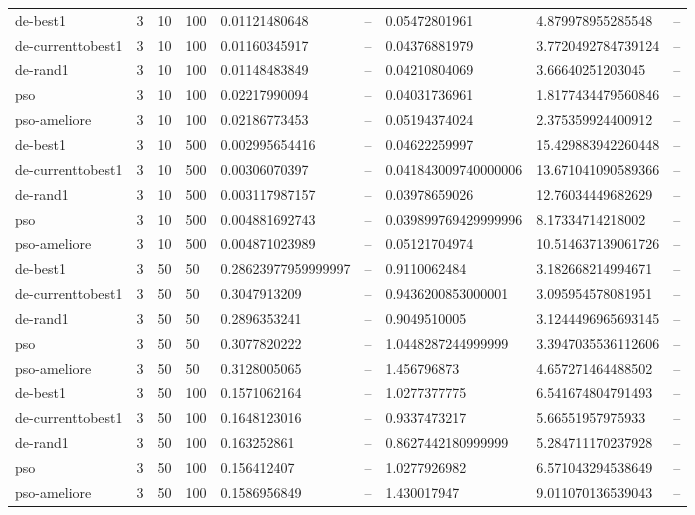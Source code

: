 \begin{table}[t]
\begin{tabular}{lllllllll}
de-best1 & 3 & 10 & 100 & 0.01121480648 & -- & 0.05472801961 & 4.879978955285548 & -- \\
de-currenttobest1 & 3 & 10 & 100 & 0.01160345917 & -- & 0.04376881979 & 3.7720492784739124 & -- \\
de-rand1 & 3 & 10 & 100 & 0.01148483849 & -- & 0.04210804069 & 3.66640251203045 & -- \\
pso & 3 & 10 & 100 & 0.02217990094 & -- & 0.04031736961 & 1.8177434479560846 & -- \\
pso-ameliore & 3 & 10 & 100 & 0.02186773453 & -- & 0.05194374024 & 2.375359924400912 & -- \\
de-best1 & 3 & 10 & 500 & 0.002995654416 & -- & 0.04622259997 & 15.429883942260448 & -- \\
de-currenttobest1 & 3 & 10 & 500 & 0.00306070397 & -- & 0.041843009740000006 & 13.671041090589366 & -- \\
de-rand1 & 3 & 10 & 500 & 0.003117987157 & -- & 0.03978659026 & 12.76034449682629 & -- \\
pso & 3 & 10 & 500 & 0.004881692743 & -- & 0.039899769429999996 & 8.17334714218002 & -- \\
pso-ameliore & 3 & 10 & 500 & 0.004871023989 & -- & 0.05121704974 & 10.514637139061726 & -- \\
de-best1 & 3 & 50 & 50 & 0.28623977959999997 & -- & 0.9110062484 & 3.182668214994671 & -- \\
de-currenttobest1 & 3 & 50 & 50 & 0.3047913209 & -- & 0.9436200853000001 & 3.095954578081951 & -- \\
de-rand1 & 3 & 50 & 50 & 0.2896353241 & -- & 0.9049510005 & 3.1244496965693145 & -- \\
pso & 3 & 50 & 50 & 0.3077820222 & -- & 1.0448287244999999 & 3.3947035536112606 & -- \\
pso-ameliore & 3 & 50 & 50 & 0.3128005065 & -- & 1.456796873 & 4.657271464488502 & -- \\
de-best1 & 3 & 50 & 100 & 0.1571062164 & -- & 1.0277377775 & 6.541674804791493 & -- \\
de-currenttobest1 & 3 & 50 & 100 & 0.1648123016 & -- & 0.9337473217 & 5.66551957975933 & -- \\
de-rand1 & 3 & 50 & 100 & 0.163252861 & -- & 0.8627442180999999 & 5.284711170237928 & -- \\
pso & 3 & 50 & 100 & 0.156412407 & -- & 1.0277926982 & 6.571043294538649 & -- \\
pso-ameliore & 3 & 50 & 100 & 0.1586956849 & -- & 1.430017947 & 9.011070136539043 & -- \\

\end{tabular}
\end{table}
